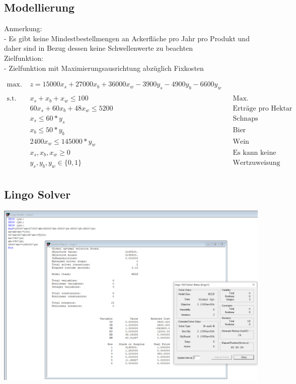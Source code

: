 \documentclass[a4paper,11pt]{article}
\begin{document}
\subsection*{Modellierung}
\begin{flushleft}
    Anmerkung: \\
    - Es gibt keine Mindestbestellmengen an Ackerfläche pro Jahr pro Produkt und daher sind in Bezug dessen keine Schwellenwerte zu beachten \\
    \bigbreak
    Zielfunktion: \\
    - Zielfunktion mit Maximierungsausrichtung abzüglich Fixkosten
\end{flushleft}

\begin{align*}
    \text{max. } & z = 15000x_{s} + 27000x_{b} + 36000x_{w} - 3900y_{s} - 4900y_{b} - 6600y_{w} \\
    \\
    \text{s.t. } & x_{s} + x_{b} + x_{w} \le 100 && \text{Max. Gesamtanbaufläche 100 Hektar} \\
    & 60x_{s} + 60x_{b} + 48x_{w} \le 5200 && \text{Erträge pro Hektar in 50 Liter Fass} \\
    & x_{s} \le 60*y_{s} && \text{Schnaps Höchstproduktion u. Binärverknüpfung} \\
    & x_{b} \le 50*y_{b} && \text{Bier Höchstproduktion u. Binärverknüpfung} \\
    & 2400x_{w} \le 145000*y_{w} && \text{Wein Höchstproduktion u. Binärverknüpfung} \\
    & x_{s}, x_{b}, x_{w} \ge 0 && \text{Es kann keine negative Menge produziert werden} \\
    & y_{s}, y_{b}, y_{w} \in \{ 0,1 \} && \text{Wertzuweisung Binärvariablen} \\
\end{align*}

\subsection*{Lingo Solver}
\begin{centering}
	\includegraphics[width=1\linewidth]{src/blatt_4_aufgabe_1_loesung_solver.PNG}
\end{centering}
\end{document}

